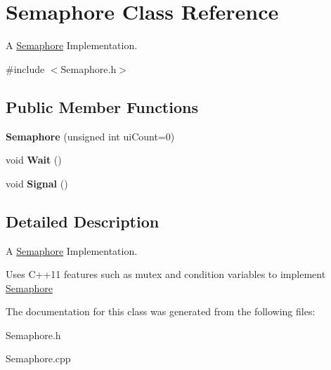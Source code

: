 \hypertarget{class_semaphore}{}\section{Semaphore Class Reference}
\label{class_semaphore}


A \mbox{\hyperlink{class_semaphore}{Semaphore}} Implementation.  




{\ttfamily \#include $<$Semaphore.\+h$>$}

\subsection*{Public Member Functions}
\begin{DoxyCompactItemize}
\item 
\mbox{\label{class_semaphore_a0d9290d316636875ca85d1d78950a817}} 
{\bfseries Semaphore} (unsigned int ui\+Count=0)
\item 
\mbox{\label{class_semaphore_a72aabebf026e3a8b1f3e4d0fa8ee1eda}} 
void {\bfseries Wait} ()
\item 
\mbox{\label{class_semaphore_a86f92f738b4486439b296d8e235895f2}} 
void {\bfseries Signal} ()
\end{DoxyCompactItemize}


\subsection{Detailed Description}
A \mbox{\hyperlink{class_semaphore}{Semaphore}} Implementation. 

Uses C++11 features such as mutex and condition variables to implement \mbox{\hyperlink{class_semaphore}{Semaphore}} 

The documentation for this class was generated from the following files\+:\begin{DoxyCompactItemize}
\item 
Semaphore.\+h\item 
Semaphore.\+cpp\end{DoxyCompactItemize}
